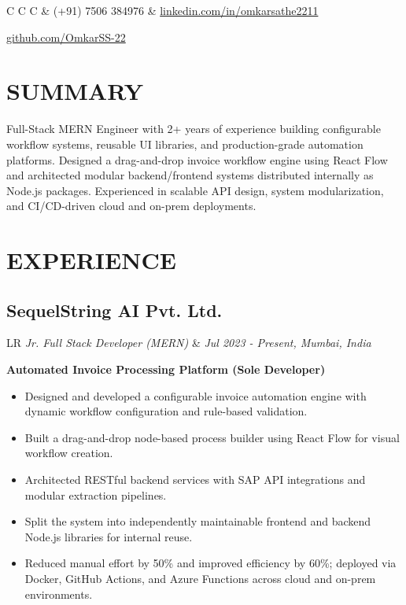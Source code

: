 \documentclass[11pt,a4paper]{moderncv}
\newcommand*{\experienceentry}[4]{
    \subsection{#1}
    \begin{tabularx}{\textwidth}{LR}
        {\itshape #2} & {\itshape #3, #4}
    \end{tabularx}
    \vspace{0.5mm}
}
\begin{document}
\maketitle
\vspace{-10mm}

\begin{tabularx}{\textwidth}{C C C}
    \emailsymbol\enspace {} & 
    \mobilephonesymbol\enspace (+91) 7506 384976 & 
    \faLinkedin\enspace \href{https://www.linkedin.com/in/omkarsathe2211}{linkedin.com/in/omkarsathe2211}
\end{tabularx}

\begin{center}
\faGithub\enspace \href{https://github.com/OmkarSS-22}{github.com/OmkarSS-22}
\end{center}

\section{SUMMARY}
Full-Stack MERN Engineer with 2+ years of experience building configurable workflow systems, reusable UI libraries, and production-grade automation platforms. Designed a drag-and-drop invoice workflow engine using React Flow and architected modular backend/frontend systems distributed internally as Node.js packages. Experienced in scalable API design, system modularization, and CI/CD-driven cloud and on-prem deployments.

\section{EXPERIENCE}

\experienceentry
{SequelString AI Pvt. Ltd.}
{Jr. Full Stack Developer (MERN)}
{Jul 2023 - Present}
{Mumbai, India}

\textbf{Automated Invoice Processing Platform (Sole Developer)}
\begin{itemize}
    \item Designed and developed a configurable invoice automation engine with dynamic workflow configuration and rule-based validation.
    \item Built a drag-and-drop node-based process builder using React Flow for visual workflow creation.
    \item Architected RESTful backend services with SAP API integrations and modular extraction pipelines.
    \item Split the system into independently maintainable frontend and backend Node.js libraries for internal reuse.
    \item Reduced manual effort by 50\% and improved efficiency by 60\%; deployed via Docker, GitHub Actions, and Azure Functions across cloud and on-prem environments.
\end{itemize}
\end{document}
